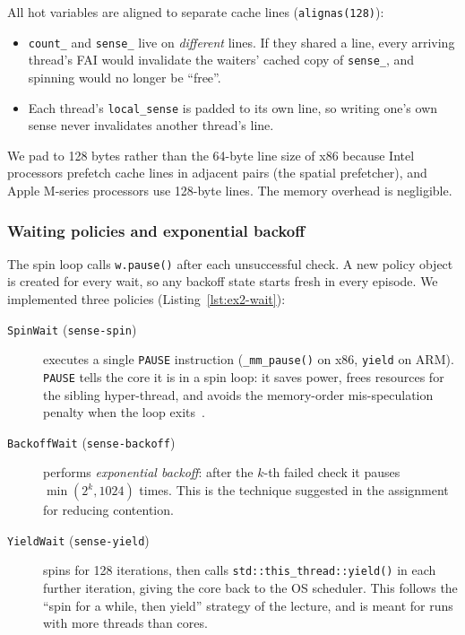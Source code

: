 All hot variables are aligned to separate cache lines
(\texttt{alignas(128)}):

\begin{itemize}
    \item \texttt{count\_} and \texttt{sense\_} live on \emph{different}
          lines. If they shared a line, every arriving thread's FAI would
          invalidate the waiters' cached copy of \texttt{sense\_}, and
          spinning would no longer be ``free''.
    \item Each thread's \texttt{local\_sense} is padded to its own line, so
          writing one's own sense never invalidates another thread's line.
\end{itemize}

We pad to 128 bytes rather than the 64-byte line size of x86 because Intel
processors prefetch cache lines in adjacent pairs (the spatial prefetcher),
and Apple M-series processors use 128-byte lines. The memory overhead is
negligible.

\subsubsection{Waiting policies and exponential backoff}
\label{sec:ex2-wait}

The spin loop calls \texttt{w.pause()} after each unsuccessful check. A new
policy object is created for every wait, so any backoff state starts fresh
in every episode. We implemented three policies
(Listing~\ref{lst:ex2-wait}):

\begin{description}
    \item[\texttt{SpinWait} (\texttt{sense-spin})] executes a single
          \texttt{PAUSE} instruction (\texttt{\_mm\_pause()} on x86,
          \texttt{yield} on ARM). \texttt{PAUSE} tells the core it is in a
          spin loop: it saves power, frees resources for the sibling
          hyper-thread, and avoids the memory-order mis-speculation penalty
          when the loop exits~\cite{intelopt}.
    \item[\texttt{BackoffWait} (\texttt{sense-backoff})] performs
          \emph{exponential backoff}: after the $k$-th failed check it
          pauses $\min(2^{k}, 1024)$ times. This is the technique suggested
          in the assignment for reducing contention.
    \item[\texttt{YieldWait} (\texttt{sense-yield})] spins for 128
          iterations, then calls \texttt{std::this\_thread::yield()} in each
          further iteration, giving the core back to the OS scheduler. This
          follows the ``spin for a while, then yield'' strategy of the
          lecture, and is meant for runs with more threads than cores.
\end{description}

